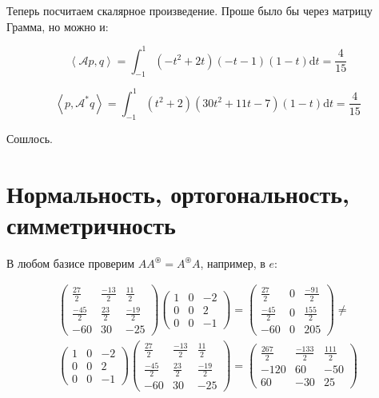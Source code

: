 \documentclass[12pt, a4paper]{article}
\begin{document}
    Теперь посчитаем скалярное произведение. Проше было бы через матрицу Грамма, но можно и:


    \begin{equation}
        \left\langle \mathcal{A} p, q \right\rangle =
        \int_{-1}^{1} (-t^2 + 2 t) (-t - 1) (1 - t) \mathrm{d}t = \frac{4}{15}
    \end{equation}


    \begin{equation}
        \left\langle p, \mathcal{A}^* q \right\rangle =
        \int_{-1}^{1} (t^{2}+2) (30 t^2 + 11t - 7) (1 - t) \mathrm{d}t = \frac{4}{15}
    \end{equation}

    Сошлось.


    \section{Нормальность, ортогональность, симметричность}

    В любом базисе проверим $AA^{\circledast} = A^{\circledast} A$, например, в $e$:

    \begin{multline}
        \left(\begin{matrix}
            \frac{27}{2} & \frac{-13}{2} & \frac{11}{2} \\
            \frac{-45}{2} & \frac{23}{2} & \frac{-19}{2} \\
            -60 & 30 & -25
        \end{matrix}\right) \left(\begin{matrix}
            1 & 0 & -2 \\
            0 & 0 & 2 \\
            0 & 0 & -1
        \end{matrix}\right) = \left(\begin{matrix}
            \frac{27}{2} & 0 & \frac{-91}{2} \\
            \frac{-45}{2} & 0 & \frac{155}{2} \\
            -60 & 0 & 205
        \end{matrix}\right) \neq \\
        \left(\begin{matrix}
            1 & 0 & -2 \\
            0 & 0 & 2 \\
            0 & 0 & -1
        \end{matrix}\right) \left(\begin{matrix}
            \frac{27}{2} & \frac{-13}{2} & \frac{11}{2} \\
            \frac{-45}{2} & \frac{23}{2} & \frac{-19}{2} \\
            -60 & 30 & -25
        \end{matrix}\right) = \left(\begin{matrix}
            \frac{267}{2} & \frac{-133}{2} & \frac{111}{2} \\
            -120 & 60 & -50 \\
            60 & -30 & 25
        \end{matrix}\right)
    \end{multline}
\end{document}
